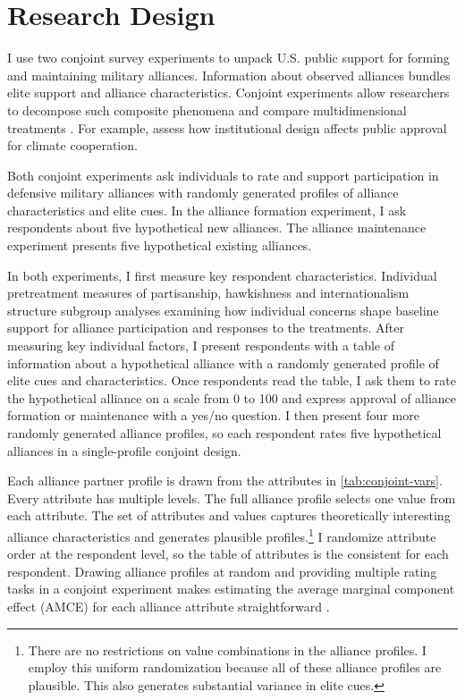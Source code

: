 \documentclass[12pt]{article}
\begin{document}
\section{Research Design}


I use two conjoint survey experiments to unpack U.S. public support for forming and maintaining military alliances. 
Information about observed alliances bundles elite support and alliance characteristics. 
Conjoint experiments allow researchers to decompose such composite phenomena and compare multidimensional treatments \citep{Hainmuelleretal2014}. 
For example, \citet{BechtelScheve2013} assess how institutional design affects public approval for climate cooperation. 


Both conjoint experiments ask individuals to rate and support participation in defensive military alliances with randomly generated profiles of alliance characteristics and elite cues. 
In the alliance formation experiment, I ask respondents about five hypothetical new alliances. 
The alliance maintenance experiment presents five hypothetical existing alliances.


In both experiments, I first measure key respondent characteristics.  
Individual pretreatment measures of partisanship, hawkishness and internationalism structure subgroup analyses examining how individual concerns shape baseline support for alliance participation and responses to the treatments. 
After measuring key individual factors, I present respondents with a table of information about a hypothetical alliance with a randomly generated profile of elite cues and characteristics.
Once respondents read the table, I ask them to rate the hypothetical alliance on a scale from 0 to 100 and express approval of alliance formation or maintenance with a yes/no question. 
I then present four more randomly generated alliance profiles, so each respondent rates five hypothetical alliances in a single-profile conjoint design.%


Each alliance partner profile is drawn from the attributes in \autoref{tab:conjoint-vars}.
Every attribute has multiple levels.
The full alliance profile selects one value from each attribute. 
The set of attributes and values captures theoretically interesting alliance characteristics and generates plausible profiles.\footnote{There are no restrictions on value combinations in the alliance profiles. I employ this uniform randomization because all of these alliance profiles are plausible. This also generates substantial variance in elite cues.}
I randomize attribute order at the respondent level, so the table of attributes is the consistent for each respondent. 
Drawing alliance profiles at random and providing multiple rating tasks in a conjoint experiment makes estimating the average marginal component effect (AMCE) for each alliance attribute straightforward \citep{Hainmuelleretal2014}. 
\end{document}
